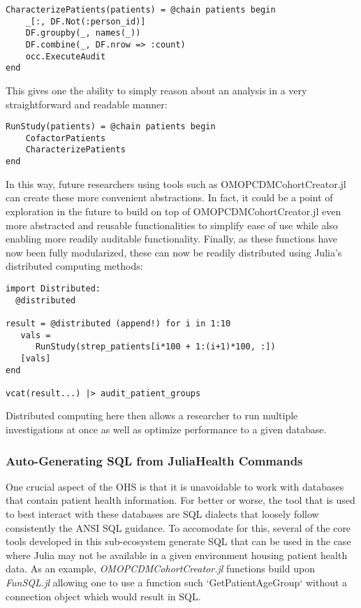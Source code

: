 \documentclass{juliacon}
\begin{document}
\begin{verbatim}
CharacterizePatients(patients) = @chain patients begin
    _[:, DF.Not(:person_id)]
    DF.groupby(_, names(_))
    DF.combine(_, DF.nrow => :count)
    occ.ExecuteAudit
end
\end{verbatim}

This gives one the ability to simply reason about an analysis in a very straightforward and readable manner:

\begin{verbatim}
RunStudy(patients) = @chain patients begin
    CofactorPatients
    CharacterizePatients
end
\end{verbatim}

In this way, future researchers using tools such as OMOPCDMCohortCreator.jl can create these more convenient abstractions.
In fact, it could be a point of exploration in the future to build on top of OMOPCDMCohortCreator.jl even more abstracted and reusable functionalities to simplify ease of use while also enabling more readily auditable functionality.
Finally, as these functions have now been fully modularized, these can now be readily distributed using Julia's distributed computing methods:

\begin{verbatim}
import Distributed:
  @distributed 

result = @distributed (append!) for i in 1:10
   vals = 
      RunStudy(strep_patients[i*100 + 1:(i+1)*100, :])
   [vals]
end

vcat(result...) |> audit_patient_groups
\end{verbatim}

Distributed computing here then allows a researcher to run multiple investigations at once as well as optimize performance to a given database.


\subsubsection{Auto-Generating SQL from JuliaHealth Commands}

One crucial aspect of the OHS is that it is unavoidable to work with databases that contain patient health information.
For better or worse, the tool that is used to best interact with these databases are SQL dialects that loosely follow consistently the ANSI SQL guidance.
To accomodate for this, several of the core tools developed in this sub-ecosystem generate SQL that can be used in the case where Julia may not be available in a given environment housing patient health data.
As an example, \textit{OMOPCDMCohortCreator.jl} functions build upon \textit{FunSQL.jl} allowing one to use a function such `GetPatientAgeGroup` without a connection object which would result in SQL.
\end{document}
